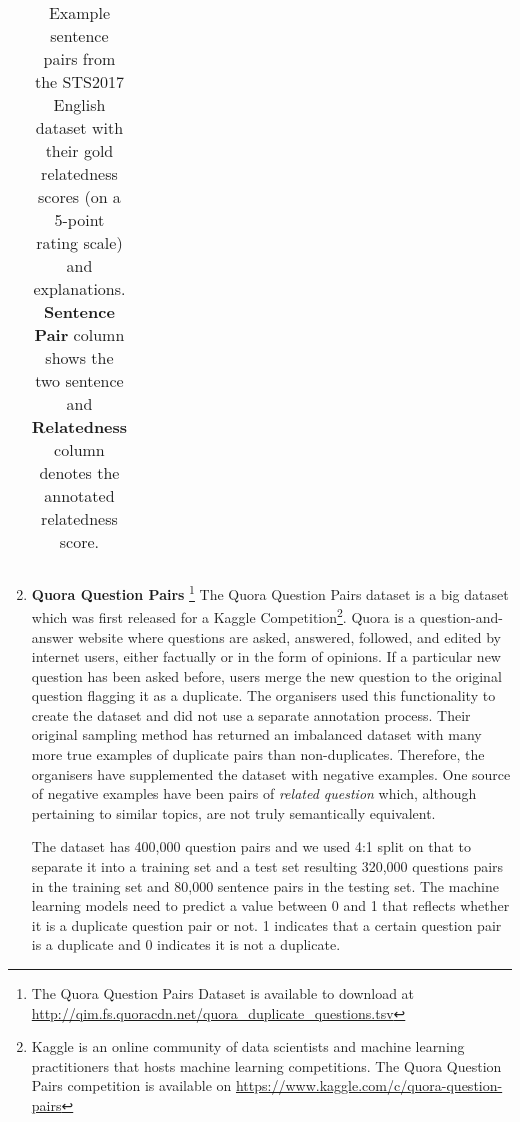 \begin{enumerate}
\begin{table}[ht!]
\begin{tabular}{l|c}
 	\end{tabular}
 	\caption[Example sentence pairs from the STS2017 English dataset]{Example sentence pairs from the STS2017 English dataset with their gold relatedness scores (on a 5-point rating scale) and explanations. \textbf{Sentence Pair} column shows the two sentence and \textbf{Relatedness} column denotes the annotated relatedness score.}
 	\label{tab:sts2017data}
 \end{table} 
  
 \item \textbf{Quora Question Pairs} \footnote{The Quora Question Pairs Dataset is available to download at \url{http://qim.fs.quoracdn.net/quora_duplicate_questions.tsv}} The Quora Question Pairs dataset is a big dataset which was first released for a Kaggle Competition\footnote{Kaggle is an online community of data scientists and machine learning practitioners that hosts machine learning competitions. The Quora Question Pairs competition is available on \url{https://www.kaggle.com/c/quora-question-pairs}}. Quora is a question-and-answer website where questions are asked, answered, followed, and edited by internet users, either factually or in the form of opinions. If a particular new question has been asked before, users merge the new question to the original question flagging it as a duplicate. The organisers used this functionality to create the dataset and did not use a separate annotation process. Their original sampling method has returned an imbalanced dataset with many more true examples of duplicate pairs than non-duplicates. Therefore, the organisers have supplemented the dataset with negative examples. One source of negative examples 
 have been pairs of \textit{related question} which, although pertaining to similar topics, are not truly semantically equivalent. 
 
 The dataset has 400,000 question pairs and we used 4:1 split on that to separate it into a training set and a test set resulting 320,000 questions pairs in the training set and  80,000 sentence pairs in the testing set. The machine learning models need to predict a value between 0 and 1 that reflects whether it is a duplicate question pair or not. 1 indicates that a certain question pair is a duplicate and 0 indicates it is not a duplicate. 
 

\end{enumerate}
